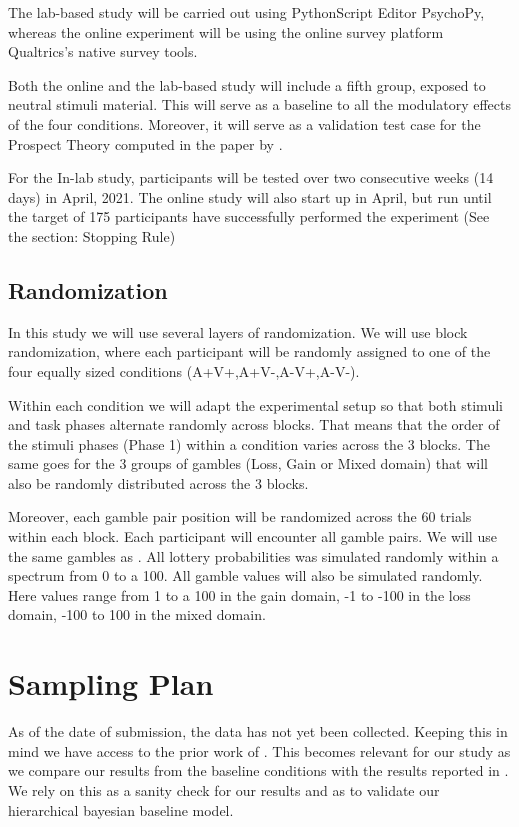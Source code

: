 \documentclass{article}
\begin{document}
The lab-based study will be carried out using PythonScript Editor PsychoPy, whereas the online experiment will be using the online survey platform Qualtrics’s native survey tools.

Both the online and the lab-based study will include a fifth group, exposed to neutral stimuli material. This will serve as a baseline to all the modulatory effects of the four conditions. Moreover, it will serve as a validation test case for the Prospect Theory computed in the paper by .

For the In-lab study, participants will be tested over two consecutive weeks (14 days) in April, 2021. The online study will also start up in April, but run until the target of 175 participants have successfully performed the experiment (See the section: Stopping Rule)

    \subsection{Randomization}
    In this study we will use several layers of randomization.
We will use block randomization, where each participant will be randomly assigned to one of the four equally sized conditions (A+V+,A+V-,A-V+,A-V-).

Within each condition we will adapt the experimental setup so that both stimuli and task phases alternate randomly across blocks. That means that the order of the stimuli phases (Phase 1) within a condition varies across the 3 blocks. The same goes for the 3 groups of gambles (Loss, Gain or Mixed domain) that will also be randomly distributed across the 3 blocks. 

Moreover, each gamble pair position will be randomized across the 60 trials within each block. Each participant will encounter all gamble pairs.
We will use the same gambles as \cite{nilsson2011jomp}. All lottery probabilities was simulated randomly within a spectrum from 0 to a 100. All gamble values will also be simulated randomly. Here values range from 1 to a 100 in the gain domain, -1 to -100 in the loss domain, -100 to 100 in the mixed domain.
    \section{Sampling Plan}
    As of the date of submission, the data has not yet been collected. Keeping this in mind we have access to the prior work of . This becomes relevant for our study as we compare our results from the baseline conditions with the results reported in . 
We rely on this as a sanity check for our results and as to validate our hierarchical bayesian baseline model. 
\end{document}
